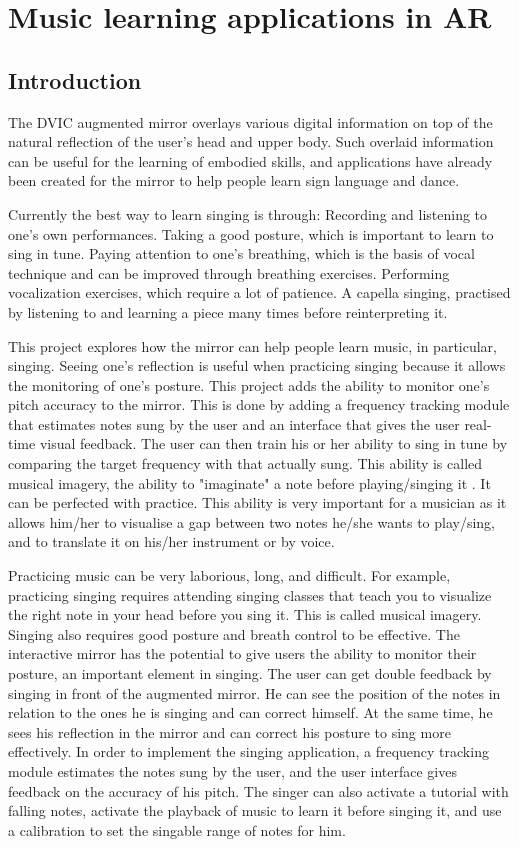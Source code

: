 \chapter{Music learning applications in AR}

\section{Introduction}

The DVIC augmented mirror overlays various digital information on top of the natural reflection of the user's head and upper body. Such overlaid information can be useful for the learning of embodied skills, and applications have already been created for the mirror to help people learn sign language and dance.

Currently the best way to learn singing is through: Recording and listening to one’s own performances. Taking a good posture, which is important to learn to sing in tune. Paying attention to one’s breathing, which is the basis of vocal technique and can be improved through breathing exercises. Performing vocalization exercises, which require a lot of patience. A capella singing, practised by listening to and learning a piece many times before reinterpreting it. 

This project explores how the mirror can help people learn music, in particular, singing. Seeing one's reflection is useful when practicing singing because it allows the monitoring of one's posture. This project adds the ability to monitor one's pitch accuracy to the mirror. This is done by adding a frequency tracking module that estimates notes sung by the user and an interface that gives the user real-time visual feedback.
The user can then train his or her ability to sing in tune by comparing the target frequency with that actually sung. This ability is called musical imagery, the ability to "imaginate" a note before playing/singing it \cite{godoy2012musical}. It can be perfected with practice. This ability is very important for a musician as it allows him/her to visualise a gap between two notes he/she wants to play/sing, and to translate it on his/her instrument or by voice.

Practicing music can be very laborious, long, and difficult. For example, practicing singing requires attending singing classes that teach you to visualize the right note in your head before you sing it. This is called musical imagery. Singing also requires good posture and breath control to be effective.
The interactive mirror has the potential to give users the ability to monitor their posture, an important element in singing. The user can get double feedback by singing in front of the augmented mirror. He can see the position of the notes in relation to the ones he is singing and can correct himself.
At the same time, he sees his reflection in the mirror and can correct his posture to sing more effectively. In order to implement the singing application, a frequency tracking module estimates the notes sung by the user, and the user interface gives feedback on the accuracy of his pitch.
The singer can also activate a tutorial with falling notes, activate the playback of music to learn it before singing it, and use a calibration to set the singable range of notes for him.

